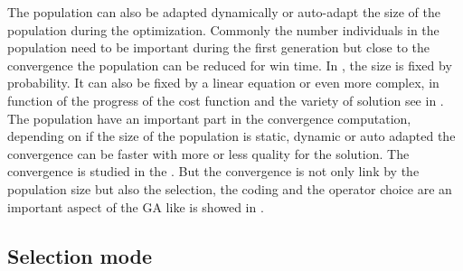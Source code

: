  The population can also be adapted dynamically or auto-adapt the size of the population during the optimization. Commonly the number individuals in the population need to be important during the first generation but close to the convergence the population can be reduced for win time.
  In \cite{133*schwefel1984}, the size is fixed by probability. It can also be fixed by a linear equation or even more complex, in function of the progress of the cost function and the variety of solution see in \cite{70*arabas1994}. The population have an important part in the convergence computation, depending on if the size of the population is static, dynamic or auto adapted the convergence can be faster with more or less quality for the solution. The convergence is studied in the \cite{109*cerf1995}. But the convergence is not only link by the population size but also the selection, the coding and the operator choice are an important aspect of the GA like is showed in \cite{71*grefenstette1986,77*shi2005}.  



\subsection{Selection mode }

